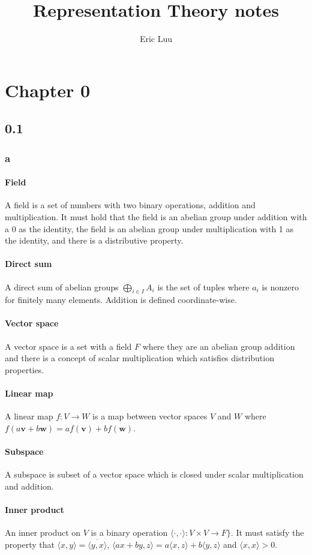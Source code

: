 \documentclass[]{article}
\title{Representation Theory notes}
\author{Eric Luu}
\begin{document}
\maketitle

\section*{Chapter 0}

\subsection*{0.1}
\subsubsection*{a}
\paragraph{Field} A field is a set of numbers with two binary operations, addition and multiplication. It must hold that the field is an abelian group under addition with a $0$ as the identity, the field is an abelian group under multiplication with 1 as the identity, and there is a distributive property. 
\paragraph{Direct sum} A direct sum of abelian groups $\bigoplus_{i \in I} A_i$ is the set of tuples where $a_i$ is nonzero for finitely many elements. Addition is defined coordinate-wise. 
\paragraph{Vector space} A vector space is a set with a field $F$ where they are an abelian group addition and there is a concept of scalar multiplication which satisfies distribution properties. 
\paragraph{Linear map} A linear map $f : V \rightarrow W$ is a map between vector spaces $V$ and $W$ where $f(a \bm{v} + b \bm{w})  = a f(\bm{v}) + b f(\bm{w})$.
\paragraph{Subspace} A subspace is subset of a vector space which is closed under scalar multiplication and addition.
\paragraph{Inner product} An inner product on $V$ is a binary operation $\langle \cdot, \cdot \rangle : V \times V \rightarrow F \rbrace$. It must satisfy the property that $\langle x, y \rangle  = \overline{\langle y, x \rangle}$, $\langle ax + by, z \rangle = a \langle x, z \rangle + b \langle y , z \rangle$ and $\langle x, x \rangle > 0$. 
\end{document}
